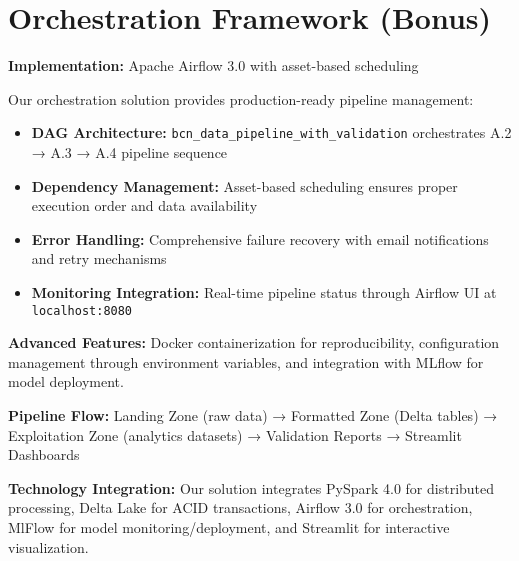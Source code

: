 
\section{Orchestration Framework (Bonus)}

\textbf{Implementation:} Apache Airflow 3.0 with asset-based scheduling

Our orchestration solution provides production-ready pipeline management:

\begin{itemize}[nosep]
\item \textbf{DAG Architecture:} \texttt{bcn\_data\_pipeline\_with\_validation} orchestrates A.2 → A.3 → A.4 pipeline sequence
\item \textbf{Dependency Management:} Asset-based scheduling ensures proper execution order and data availability
\item \textbf{Error Handling:} Comprehensive failure recovery with email notifications and retry mechanisms
\item \textbf{Monitoring Integration:} Real-time pipeline status through Airflow UI at \texttt{localhost:8080}
\end{itemize}

\textbf{Advanced Features:} Docker containerization for reproducibility, configuration management through environment variables, and integration with MLflow for model deployment.

\textbf{Pipeline Flow:} Landing Zone (raw data) → Formatted Zone (Delta tables) → Exploitation Zone (analytics datasets) → Validation Reports → Streamlit Dashboards

\textbf{Technology Integration:} Our solution integrates PySpark 4.0 for distributed processing, Delta Lake for ACID transactions, Airflow 3.0 for orchestration, MlFlow for model monitoring/deployment, and Streamlit for interactive visualization.